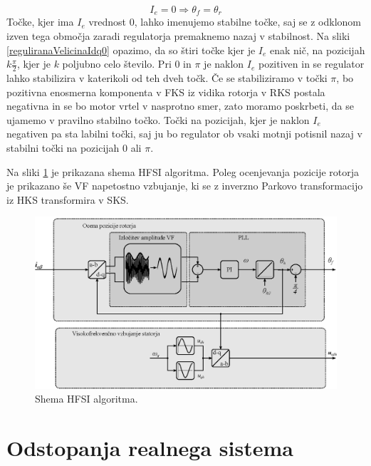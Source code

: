 \documentclass[a4paper,twoside,openright,12pt,slovene]{book}
\begin{document}
\begin{equation}
    I_e = 0 \Rightarrow \theta_{f} = \theta_{r}
\end{equation}
Točke, kjer ima $I_e$ vrednost 0, lahko imenujemo stabilne točke, saj se z odklonom izven tega območja zaradi regulatorja premaknemo nazaj v stabilnost. Na sliki \ref{reguliranaVelicinaIdq0} opazimo,
da so štiri točke kjer je $I_e$ enak nič, na pozicijah $k\frac{\pi}{2}$, kjer je $k$ poljubno celo število. Pri 0 in $\pi$ je naklon $I_e$ pozitiven in se regulator lahko stabilizira v katerikoli od
teh dveh točk. Če se stabiliziramo v točki $\pi$, bo pozitivna enosmerna komponenta v FKS iz vidika rotorja v RKS postala negativna in se bo motor vrtel v nasprotno smer, zato moramo poskrbeti, da se
ujamemo v pravilno stabilno točko. Točki na pozicijah, kjer je naklon $I_e$ negativen pa sta labilni točki, saj ju bo regulator ob vsaki motnji potisnil nazaj v stabilni točki na pozicijah 0 ali
$\pi$.

\newpage
Na sliki \ref{HFSIsimple} je prikazana shema HFSI algoritma. Poleg ocenjevanja pozicije rotorja je prikazano še VF napetostno vzbujanje, ki se z inverzno Parkovo transformacijo iz HKS transformira v
SKS.

\begin{figure}[!htbp]
    \centering
    \includegraphics[width=0.9\columnwidth]{Slike/Inkscape/HFSIsimple.eps}
    \caption{\label{HFSIsimple} Shema HFSI algoritma.}
\end{figure}
\newpage
\section{Odstopanja realnega sistema}
\end{document}
